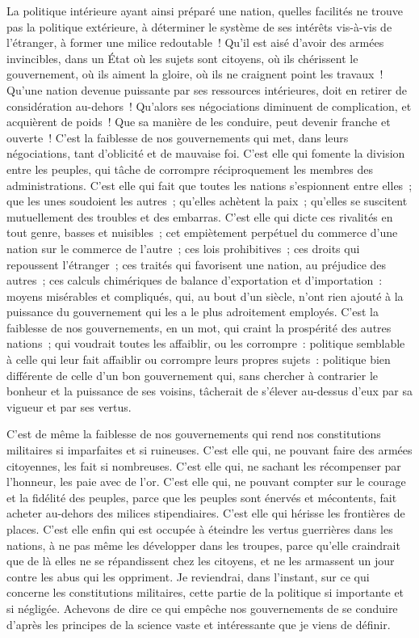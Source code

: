 \documentclass[french,twoside]{book} %
\begin{document}
La politique intérieure ayant ainsi préparé une nation, quelles facilités ne trouve pas la politique extérieure, à déterminer le système de ses intérêts vis-à-vis de l’étranger, à former une milice redoutable ! Qu’il est aisé d’avoir des armées invincibles, dans un État où les sujets sont citoyens, où ils chérissent le gouvernement, où ils aiment la gloire, où ils ne craignent point les travaux ! Qu’une nation devenue puissante par ses ressources intérieures, doit en retirer de considération au-dehors ! Qu’alors ses négociations diminuent de complication, et acquièrent de poids ! Que sa manière de les conduire, peut devenir franche et ouverte ! C’est la faiblesse de nos gouvernements qui met, dans leurs négociations, tant d’oblicité et de mauvaise foi. C’est elle qui fomente la division entre les peuples, qui tâche de corrompre réciproquement les membres des administrations. C’est elle qui fait que toutes les nations s’espionnent entre elles ; que les unes soudoient les autres ; qu’elles achètent la paix ; qu’elles se suscitent mutuellement des troubles et des embarras. C’est elle qui dicte ces rivalités en tout genre, basses et nuisibles ; cet empiètement perpétuel du commerce d’une nation sur le commerce de l’autre ; ces lois prohibitives ; ces droits qui repoussent l’étranger ; ces traités qui favorisent une nation, au préjudice des autres ; ces calculs chimériques de balance d’exportation et d’importation : moyens misérables et compliqués, qui, au bout d’un siècle, n’ont rien ajouté à la puissance du gouvernement qui les a le plus adroitement employés. C’est la faiblesse de nos gouvernements, en un mot, qui craint la prospérité des autres nations ; qui voudrait toutes les affaiblir, ou les corrompre : politique semblable à celle qui leur fait affaiblir ou corrompre leurs propres sujets : politique bien différente de celle d’un bon gouvernement qui, sans chercher à contrarier le bonheur et la puissance de ses voisins, tâcherait de s’élever au-dessus d’eux par sa vigueur et par ses vertus.\par
C’est de même la faiblesse de nos gouvernements qui rend nos constitutions militaires si imparfaites et si ruineuses. C’est elle qui, ne pouvant faire des armées citoyennes, les fait si nombreuses. C’est elle qui, ne sachant les récompenser par l’honneur, les paie avec de l’or. C’est elle qui, ne pouvant compter sur le courage et la fidélité des peuples, parce que les peuples sont énervés et mécontents, fait acheter au-dehors des milices stipendiaires. C’est elle qui hérisse les frontières de places. C’est elle enfin qui est occupée à éteindre les vertus guerrières dans les nations, à ne pas même les développer dans les troupes, parce qu’elle craindrait que de là elles ne se répandissent chez les citoyens, et ne les armassent un jour contre les abus qui les oppriment. Je reviendrai, dans l’instant, sur ce qui concerne les constitutions militaires, cette partie de la politique si importante et si négligée. Achevons de dire ce qui empêche nos gouvernements de se conduire d’après les principes de la science vaste et intéressante que je viens de définir.\par
\end{document}
